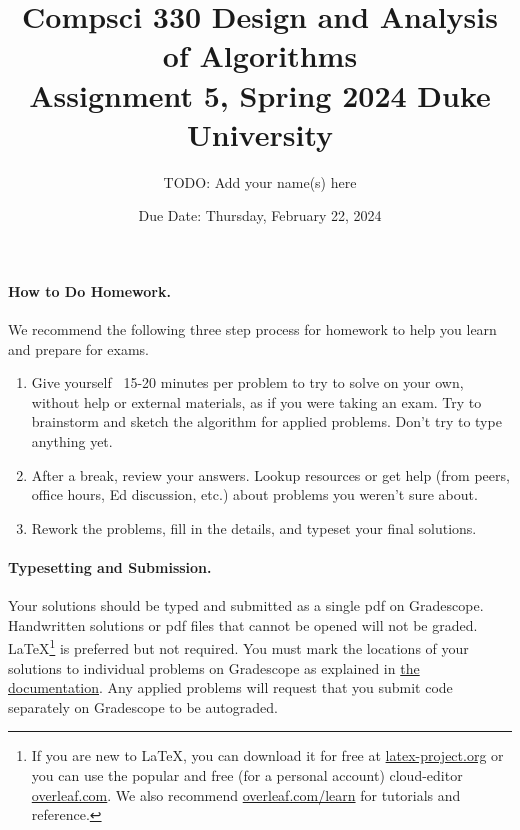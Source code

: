 \documentclass[11pt]{article}
\title{\vspace{-0.5in}Compsci 330 Design and Analysis of Algorithms \\Assignment 5, Spring 2024 Duke University}
\author{TODO: Add your name(s) here}
\date{Due Date: Thursday, February 22, 2024}
\begin{document}
\maketitle



\paragraph{How to Do Homework.} We recommend the following three step process for homework to help you learn and prepare for exams.
\begin{enumerate}
	\item Give yourself ~15-20 minutes per problem to try to solve on your own, without help or external materials, as if you were taking an exam. Try to brainstorm and sketch the algorithm for applied problems. Don't try to type anything yet.
	\item After a break, review your answers. Lookup resources or get help (from peers, office hours, Ed discussion, etc.) about problems you weren't sure about.
	\item Rework the problems, fill in the details, and typeset your final solutions.
\end{enumerate}

\paragraph{Typesetting and Submission.} Your solutions should be typed and submitted as a single pdf on Gradescope. Handwritten solutions or pdf files that cannot be opened will not be graded. \LaTeX \footnote{If you are new to \LaTeX, you can download it for free at \href{https://www.latex-project.org}{latex-project.org} or you can use the popular and free (for a personal account) cloud-editor \href{https://www.overleaf.com}{overleaf.com}. We also recommend \href{https://www.overleaf.com/learn}{overleaf.com/learn} for tutorials and reference.} is preferred but not required. %
You must mark the locations of your solutions to individual problems on Gradescope as explained in \href{https://help.gradescope.com/article/ccbpppziu9-student-submit-work#submitting_a_pdf}{the documentation}. Any applied problems will request that you submit code separately on Gradescope to be autograded. 
\end{document}
